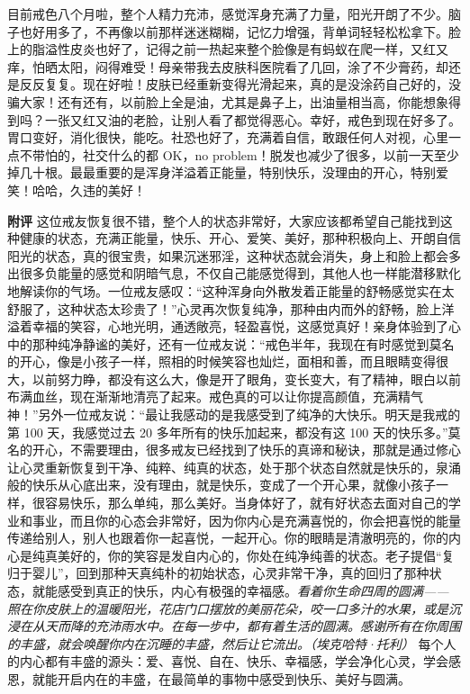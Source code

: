 \begin{case}
    目前戒色八个月啦，整个人精力充沛，感觉浑身充满了力量，阳光开朗了不少。脑子也好用多了，不再像以前那样迷迷糊糊，记忆力增强，背单词轻轻松松拿下。脸上的脂溢性皮炎也好了，记得之前一热起来整个脸像是有蚂蚁在爬一样，又红又痒，怕晒太阳，闷得难受！母亲带我去皮肤科医院看了几回，涂了不少膏药，却还是反反复复。现在好啦！皮肤已经重新变得光滑起来，真的是没涂药自己好的，没骗大家！还有还有，以前脸上全是油，尤其是鼻子上，出油量相当高，你能想象得到吗？一张又红又油的老脸，让别人看了都觉得恶心。幸好，戒色到现在好多了。胃口变好，消化很快，能吃。社恐也好了，充满着自信，敢跟任何人对视，心里一点不带怕的，社交什么的都 OK，no problem！脱发也减少了很多，以前一天至少掉几十根。最最重要的是浑身洋溢着正能量，特别快乐，没理由的开心，特别爱笑！哈哈，久违的美好！

    \textbf{附评} 这位戒友恢复很不错，整个人的状态非常好，大家应该都希望自己能找到这种健康的状态，充满正能量，快乐、开心、爱笑、美好，那种积极向上、开朗自信阳光的状态，真的很宝贵，如果沉迷邪淫，这种状态就会消失，身上和脸上都会多出很多负能量的感觉和阴暗气息，不仅自己能感觉得到，其他人也一样能潜移默化地解读你的气场。一位戒友感叹：“这种浑身向外散发着正能量的舒畅感觉实在太舒服了，这种状态太珍贵了！”心灵再次恢复纯净，那种由内而外的舒畅，脸上洋溢着幸福的笑容，心地光明，通透敞亮，轻盈喜悦，这感觉真好！亲身体验到了心中的那种纯净静谧的美好，还有一位戒友说：“戒色半年，我现在有时感觉到莫名的开心，像是小孩子一样，照相的时候笑容也灿烂，面相和善，而且眼睛变得很大，以前努力睁，都没有这么大，像是开了眼角，变长变大，有了精神，眼白以前布满血丝，现在渐渐地清亮了起来。戒色真的可以让你提高颜值，充满精气神！”另外一位戒友说：“最让我感动的是我感受到了纯净的大快乐。明天是我戒的第 100 天，我感觉过去 20 多年所有的快乐加起来，都没有这 100 天的快乐多。”莫名的开心，不需要理由，很多戒友已经找到了快乐的真谛和秘诀，那就是通过修心让心灵重新恢复到干净、纯粹、纯真的状态，处于那个状态自然就是快乐的，泉涌般的快乐从心底出来，没有理由，就是快乐，变成了一个开心果，就像小孩子一样，很容易快乐，那么单纯，那么美好。当身体好了，就有好状态去面对自己的学业和事业，而且你的心态会非常好，因为你内心是充满喜悦的，你会把喜悦的能量传递给别人，别人也跟着你一起喜悦，一起开心。你的眼睛是清澈明亮的，你的内心是纯真美好的，你的笑容是发自内心的，你处在纯净纯善的状态。老子提倡“复归于婴儿”，回到那种天真纯朴的初始状态，心灵非常干净，真的回归了那种状态，就能感受到真正的快乐，内心有极强的幸福感。\textit{看着你生命四周的圆满——照在你皮肤上的温暖阳光，花店门口摆放的美丽花朵，咬一口多汁的水果，或是沉浸在从天而降的充沛雨水中。在每一步中，都有着生活的圆满。感谢所有在你周围的丰盛，就会唤醒你内在沉睡的丰盛，然后让它流出。（埃克哈特·托利）} 每个人的内心都有丰盛的源头：爱、喜悦、自在、快乐、幸福感，学会净化心灵，学会感恩，就能开启内在的丰盛，在最简单的事物中感受到快乐、美好与圆满。
\end{case}

